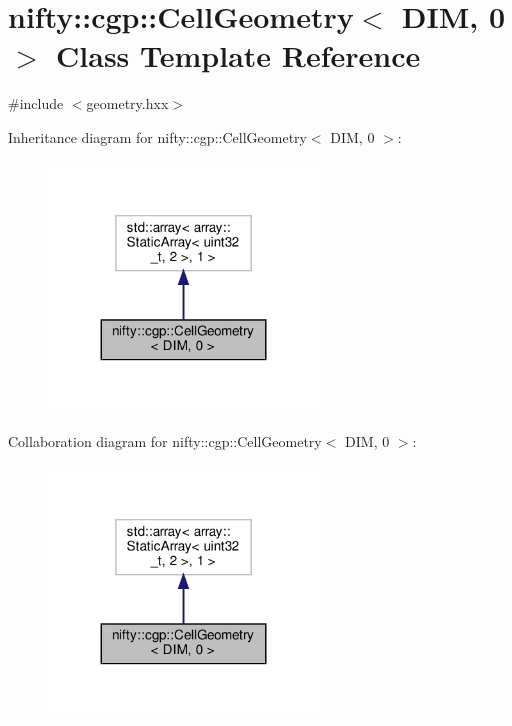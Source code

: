 \hypertarget{classnifty_1_1cgp_1_1CellGeometry_3_01DIM_00_010_01_4}{}\section{nifty\+:\+:cgp\+:\+:Cell\+Geometry$<$ D\+IM, 0 $>$ Class Template Reference}
\label{classnifty_1_1cgp_1_1CellGeometry_3_01DIM_00_010_01_4}


{\ttfamily \#include $<$geometry.\+hxx$>$}



Inheritance diagram for nifty\+:\+:cgp\+:\+:Cell\+Geometry$<$ D\+IM, 0 $>$\+:
\nopagebreak
\begin{figure}[H]
\begin{center}
\leavevmode
\includegraphics[width=203pt]{classnifty_1_1cgp_1_1CellGeometry_3_01DIM_00_010_01_4__inherit__graph}
\end{center}
\end{figure}


Collaboration diagram for nifty\+:\+:cgp\+:\+:Cell\+Geometry$<$ D\+IM, 0 $>$\+:
\nopagebreak
\begin{figure}[H]
\begin{center}
\leavevmode
\includegraphics[width=203pt]{classnifty_1_1cgp_1_1CellGeometry_3_01DIM_00_010_01_4__coll__graph}
\end{center}
\end{figure}
